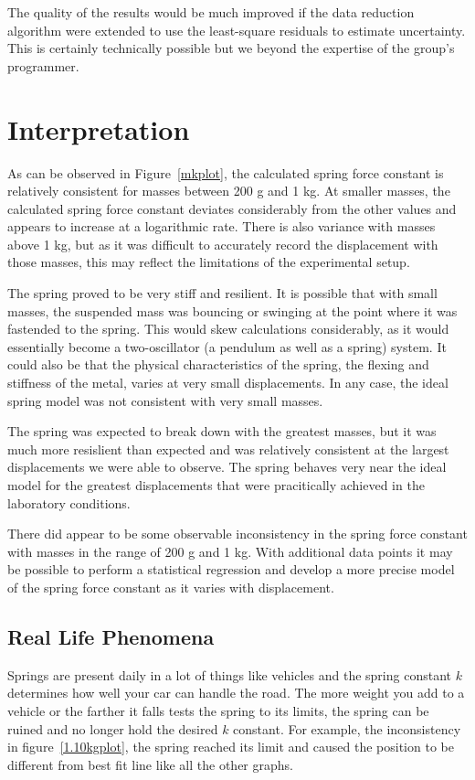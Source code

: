 \documentclass{article}
\numberwithin{figure}{section}
\numberwithin{table}{section}
\begin{document}
The quality of the results would be much improved if the data reduction algorithm were extended to use the least-square residuals to estimate uncertainty.  This is certainly technically possible but we beyond the expertise of the group's programmer.

\FloatBarrier 

\section{Interpretation} 

As can be observed in Figure~\ref{mkplot}, the calculated spring force constant is relatively consistent for masses between 200 g and 1 kg.  At smaller masses, the calculated spring force constant deviates considerably from the other values and appears to increase at a logarithmic rate.  There is also variance with masses above 1 kg, but as it was difficult to accurately record the displacement with those masses, this may reflect the limitations of the experimental setup.

The spring proved to be very stiff and resilient.  It is possible that with small masses, the suspended mass was bouncing or swinging at the point where it was fastended to the spring.  This would skew calculations considerably, as it would essentially become a two-oscillator (a pendulum as well as a spring) system.  It could also be that the physical characteristics of the spring, the flexing and stiffness of the metal, varies at very small displacements.  In any case, the ideal spring model was not consistent with very small masses.

The spring was expected to break down with the greatest masses, but it was much more resislient than expected and was relatively consistent at the largest displacements we were able to observe.  The spring behaves very near the ideal model for the greatest displacements that were pracitically achieved in the laboratory conditions.

There did appear to be some observable inconsistency in the spring force constant with masses in the range of 200 g and 1 kg.  With additional data points it may be possible to perform a statistical regression and develop a more precise model of the spring force constant as it varies with displacement. 


\subsection{Real Life Phenomena} 

Springs are present daily in a lot of things like vehicles and the spring constant $k$ determines how well your car can handle the road. The more weight you add to a vehicle or the farther it falls tests the spring to its limits, the spring can be ruined and no longer hold the desired $k$ constant.  For example, the inconsistency in figure~\ref{1.10kgplot}, the spring reached its limit and caused the position to be different from best fit line like all the other graphs.
\end{document}
